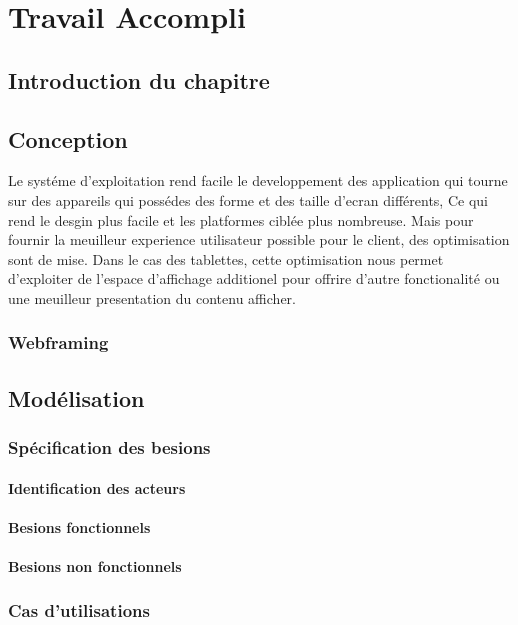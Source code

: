 
\chapter{Travail Accompli}
\section{Introduction du chapitre}

\section{Conception}
Le systéme d'exploitation \android rend facile le developpement des application qui tourne sur des appareils qui possédes des forme et des taille d'ecran différents, Ce qui rend le desgin plus facile et les platformes ciblée plus nombreuse. %
Mais pour fournir la meuilleur experience utilisateur possible pour le client, des optimisation sont de mise. Dans le cas des tablettes, cette optimisation nous permet d'exploiter de l'espace d'affichage additionel pour offrire d'autre fonctionalité ou une meuilleur presentation du contenu afficher.

\subsection{Webframing}

\section{Modélisation}
\subsection{Spécification des besions}

\subsubsection{Identification des acteurs}
\subsubsection{Besions fonctionnels}
\subsubsection{Besions non fonctionnels}

\subsection{Cas d'utilisations}

